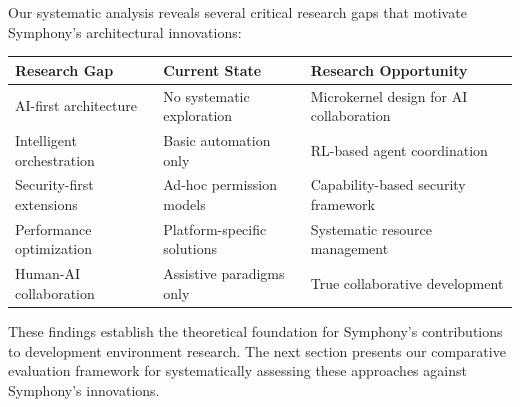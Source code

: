 Our systematic analysis reveals several critical research gaps that motivate Symphony's architectural innovations:

\begin{center}
\begin{tabular}{@{}lll@{}}
\toprule
\textbf{Research Gap} & \textbf{Current State} & \textbf{Research Opportunity} \\
\midrule
AI-first architecture & No systematic exploration & Microkernel design for AI collaboration \\
Intelligent orchestration & Basic automation only & RL-based agent coordination \\
Security-first extensions & Ad-hoc permission models & Capability-based security framework \\
Performance optimization & Platform-specific solutions & Systematic resource management \\
Human-AI collaboration & Assistive paradigms only & True collaborative development \\
\bottomrule
\end{tabular}
\label{tab:research-gaps}
\end{center}

These findings establish the theoretical foundation for Symphony's contributions to development environment research. The next section presents our comparative evaluation framework for systematically assessing these approaches against Symphony's innovations.
